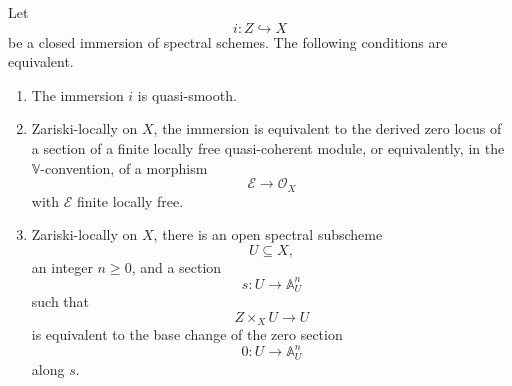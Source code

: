 \begin{theorem}
\label{thm:quasi-smooth-local-zero-locus}
Let
\[
    i
    \colon
    Z
    \hookrightarrow
    X
\]
be a closed immersion of spectral schemes. The following conditions are
equivalent.
\begin{enumerate}[label=(\roman*)]
    \item The immersion \(i\) is quasi-smooth.

    \item Zariski-locally on \(X\), the immersion is equivalent to the
    derived zero locus of a section of a finite locally free
    quasi-coherent module, or equivalently, in the
    \(\mathbb V\)-convention, of a morphism
    \[
        \mathcal E
        \longrightarrow
        \mathcal O_X
    \]
    with \(\mathcal E\) finite locally free.

    \item Zariski-locally on \(X\), there is an open spectral subscheme
    \[
        U
        \subseteq
        X,
    \]
    an integer \(n\geq0\), and a section
    \[
        s
        \colon
        U
        \longrightarrow
        \mathbb A_U^n
    \]
    such that
    \[
        Z\times_XU
        \longrightarrow
        U
    \]
    is equivalent to the base change of the zero section
    \[
        0
        \colon
        U
        \longrightarrow
        \mathbb A_U^n
    \]
    along \(s\).
\end{enumerate}
\end{theorem}

